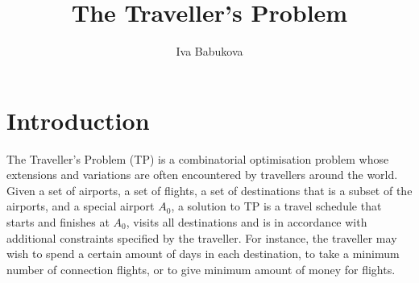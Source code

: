 \documentclass{mpaper}
\begin{document}
\title{The Traveller's Problem}
\author{Iva Babukova}

\maketitle


\section{Introduction}
\label{intro}

The Traveller's Problem (TP) is a combinatorial optimisation problem whose extensions and variations are often encountered by travellers around the world.
Given a set of airports, a set of flights, a set of destinations that is a subset of the airports, and a special airport $A_{0}$, a solution to TP is a travel schedule that starts and finishes at $A_{0}$, visits all destinations and is in accordance with additional constraints specified by the traveller. For instance, the traveller may wish to spend a certain amount of days in each destination, to take a minimum number of connection flights, or to give minimum amount of money for flights.

\end{document}
